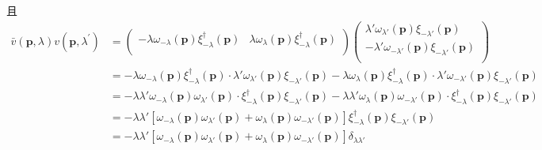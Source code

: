 且
\begin{equation}
    \begin{aligned}
        \bar{v}\left( \mathbf{p},\lambda \right) v\left( \mathbf{p},\lambda ^{\prime} \right) &=\left( \begin{matrix}
	-\lambda \omega _{-\lambda}\left( \mathbf{p} \right) \xi _{-\lambda}^{\dagger}\left( \mathbf{p} \right)&		\lambda \omega _{\lambda}\left( \mathbf{p} \right) \xi _{-\lambda}^{\dagger}\left( \mathbf{p} \right)\\
\end{matrix} \right) \left( \begin{array}{c}
	\lambda \prime \omega _{\lambda \prime}\left( \mathbf{p} \right) \xi _{-\lambda \prime}\left( \mathbf{p} \right)\\
	-\lambda \prime \omega _{-\lambda \prime}\left( \mathbf{p} \right) \xi _{-\lambda \prime}\left( \mathbf{p} \right)\\
\end{array} \right) 
\\
&=-\lambda \omega _{-\lambda}\left( \mathbf{p} \right) \xi _{-\lambda}^{\dagger}\left( \mathbf{p} \right) \cdot \lambda \prime \omega _{\lambda \prime}\left( \mathbf{p} \right) \xi _{-\lambda \prime}\left( \mathbf{p} \right) -\lambda \omega _{\lambda}\left( \mathbf{p} \right) \xi _{-\lambda}^{\dagger}\left( \mathbf{p} \right) \cdot \lambda \prime \omega _{-\lambda \prime}\left( \mathbf{p} \right) \xi _{-\lambda \prime}\left( \mathbf{p} \right) 
\\
&=-\lambda \lambda \prime \omega _{-\lambda}\left( \mathbf{p} \right) \omega _{\lambda \prime}\left( \mathbf{p} \right) \cdot \xi _{-\lambda}^{\dagger}\left( \mathbf{p} \right) \xi _{-\lambda \prime}\left( \mathbf{p} \right) -\lambda \lambda \prime \omega _{\lambda}\left( \mathbf{p} \right) \omega _{-\lambda \prime}\left( \mathbf{p} \right) \cdot \xi _{-\lambda}^{\dagger}\left( \mathbf{p} \right) \xi _{-\lambda \prime}\left( \mathbf{p} \right) 
\\
&=-\lambda \lambda \prime \left[ \omega _{-\lambda}\left( \mathbf{p} \right) \omega _{\lambda \prime}\left( \mathbf{p} \right) +\omega _{\lambda}\left( \mathbf{p} \right) \omega _{-\lambda \prime}\left( \mathbf{p} \right) \right] \xi _{-\lambda}^{\dagger}\left( \mathbf{p} \right) \xi _{-\lambda \prime}\left( \mathbf{p} \right) 
\\
&=-\lambda \lambda \prime \left[ \omega _{-\lambda}\left( \mathbf{p} \right) \omega _{\lambda \prime}\left( \mathbf{p} \right) +\omega _{\lambda}\left( \mathbf{p} \right) \omega _{-\lambda \prime}\left( \mathbf{p} \right) \right] \delta _{\lambda \lambda \prime}

\end{aligned}
\end{equation}
